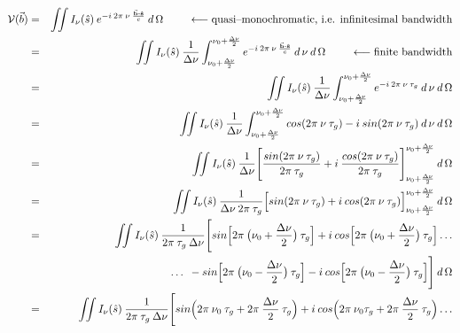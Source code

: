 \documentclass[11pt, a4paper]{article}
\newcommand{\msp}{\mkern \medmuskip}
\begin{document}
\begin{eqnarray}
  \mathcal{V}(\vec{b}) &=& \iint I_\nu (\hat{s}) \msp e^{-i \msp 2\pi \msp \nu \msp \frac{\vec{\mathbf{b}} \boldsymbol{\cdot} \mathbf{\hat{s}}}{c}} \msp d\,\Omega \hspace{0.8cm} \longleftarrow \mbox{quasi--monochromatic, i.e. infinitesimal bandwidth} \nonumber \\
&=& \iint I_\nu (\hat{s}) \msp \frac{1}{\Delta \nu } \int ^{\nu_ 0 + \frac{\Delta \nu }{2}} _{\nu_ 0 + \frac{\Delta \nu }{2}} e^{-i \msp 2\pi \msp \nu \msp \frac{\vec{\mathbf{b}} \boldsymbol{\cdot} \mathbf{\hat{s}}}{c}} \msp d\, \nu \msp d\,\Omega \hspace{0.8cm} \longleftarrow \mbox{finite bandwidth} \nonumber \\
&=& \iint I_\nu (\hat{s}) \msp \frac{1}{\Delta \nu } \int ^{\nu_ 0 + \frac{\Delta \nu }{2}} _{\nu_ 0 + \frac{\Delta \nu }{2}} e^{-i \msp 2\pi \msp \nu \msp \tau _g} \msp d\, \nu \msp d\,\Omega \nonumber \\
&=& \iint I_\nu (\hat{s}) \msp \frac{1}{\Delta \nu } \int ^{\nu_ 0 + \frac{\Delta \nu }{2}} _{\nu_ 0 + \frac{\Delta \nu }{2}} cos(2\pi \msp \nu \msp \tau _g) - i \msp sin(2\pi \msp \nu \msp \tau _g)  \msp d\, \nu \msp d\,\Omega \nonumber \\
&=& \iint I_\nu (\hat{s}) \msp \frac{1}{\Delta \nu } \Bigg [\frac{sin(2\pi \msp \nu \msp \tau _g)}{2\pi \msp \tau _g} + i \msp \frac{cos(2\pi \msp \nu \msp \tau _g)}{2\pi \msp \tau _g}\Bigg ]^{\nu_ 0 + \frac{\Delta \nu }{2}} _{\nu_ 0 + \frac{\Delta \nu }{2}} \msp d\,\Omega \nonumber \\
&=& \iint I_\nu (\hat{s}) \msp \frac{1}{\Delta \nu \msp 2\pi \msp \tau _g} \Big [sin(2\pi \msp \nu \msp \tau _g) + i \msp cos(2\pi \msp \nu \msp \tau _g)\Big ]^{\nu_ 0 + \frac{\Delta \nu }{2}} _{\nu_ 0 + \frac{\Delta \nu }{2}} \msp d\,\Omega \nonumber \\
&=& \iint I_\nu (\hat{s}) \msp \frac{1}{2\pi \msp \tau _g \msp \Delta \nu} \Bigg [sin\Big [2\pi \msp \big (\nu_ 0 + \frac{\Delta \nu }{2}\big ) \msp \tau _g\Big ] + i \msp cos\Big [2\pi \msp \big (\nu_ 0 + \frac{\Delta \nu }{2}\big ) \msp \tau _g\Big ] \dotso \nonumber \\
&& \dotso \enspace - sin\Big [2\pi \msp \big(\nu_ 0 - \frac{\Delta \nu }{2}\big ) \msp \tau _g\Big ] - i \msp cos\Big [2\pi \msp \big (\nu_ 0 - \frac{\Delta \nu }{2}\big ) \msp \tau _g\Big ]\Bigg ] \msp d\,\Omega \nonumber \\
&=& \iint I_\nu (\hat{s}) \msp \frac{1}{2\pi \msp \tau _g \msp \Delta \nu} \Bigg [sin\Big (2\pi \msp \nu_ 0 \msp \tau _g + 2\pi \msp \frac{\Delta \nu }{2} \msp \tau _g\Big ) + i \msp cos\Big (2\pi \msp \nu_ 0 \tau _g + 2\pi \msp \frac{\Delta \nu }{2} \msp \tau _g\Big ) \dotso \nonumber \\

\end{eqnarray}
\end{document}
